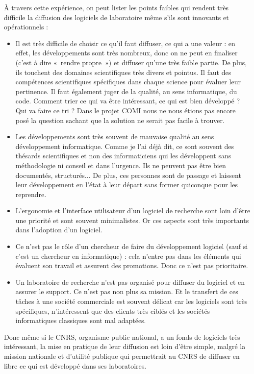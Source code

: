 \documentclass{FramateX}
\begin{document}
\begin{refsection}
À travers cette expérience, on peut lister les points faibles qui
rendent très difficile la diffusion des logiciels de laboratoire même
s'ils sont innovants et opérationnels :

\begin{itemize}
\item Il est très difficile de choisir ce qu'il faut diffuser, ce qui a
une valeur : en effet, les développements sont très nombreux, donc on
ne peut en finaliser (c'est à dire «~rendre propre~») et diffuser
qu'une très faible partie. De plus, ils touchent des domaines
scientifiques très divers et pointus. Il faut des compétences
scientifiques spécifiques dans chaque science pour évaluer leur
pertinence. Il faut également juger de la qualité, au sens
informatique, du code. Comment trier ce qui va être intéressant, ce qui
est bien développé ? Qui va faire ce tri ? Dans le projet COMI nous ne
nous étions pas encore posé la question sachant que la solution ne
serait pas facile à trouver.
\item Les développements sont très souvent de mauvaise qualité au sens
développement informatique. Comme je l'ai déjà dit, ce sont souvent des
thésards scientifiques et non des informaticiens qui les développent
sans méthodologie ni conseil et dans l'urgence. Ils ne peuvent pas être
bien documentés, structurés... De plus, ces personnes sont de passage
et laissent leur développement en l'état à leur départ sans former
quiconque pour les reprendre.
\item L'ergonomie et l'interface utilisateur d'un
logiciel de recherche sont loin d'être une priorité et sont souvent
minimalistes. Or ces aspects sont très importants dans l'adoption d'un
logiciel.
\item Ce n'est pas le rôle d'un chercheur de faire du développement
logiciel (sauf si c'est un chercheur en informatique) : cela n'entre
pas dans les éléments qui évaluent son travail et assurent des
promotions. Donc ce n'est pas prioritaire.
\item Un laboratoire de recherche n'est pas organisé pour diffuser du
logiciel et en assurer le support. Ce n'est pas non plus sa mission. Et
le transfert de ces tâches à une société commerciale est souvent
délicat car les logiciels sont très spécifiques, n'intéressent que des
clients très ciblés et les sociétés informatiques classiques sont mal
adaptées.
\end{itemize}
Donc même si le CNRS, organisme public national, a un fonds de logiciels
très intéressant, la mise en pratique de leur diffusion est loin d'être
simple, malgré la mission nationale et d'utilité publique qui
permettrait au CNRS de diffuser en libre ce qui est développé dans ses
laboratoires.



\end{refsection}
\end{document}
